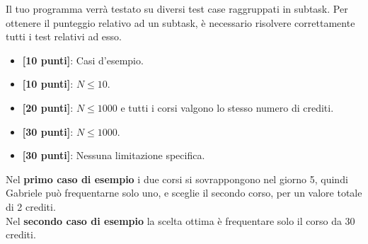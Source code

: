 \Scoring
Il tuo programma verrà testato su diversi test case raggruppati in subtask.
Per ottenere il punteggio relativo ad un subtask, è necessario risolvere
correttamente tutti i test relativi ad esso.

\begin{itemize}[nolistsep,itemsep=2mm]
  \item \textbf{ [10 punti]}: Casi d'esempio.
  \item \textbf{ [10 punti]}: $N \le 10$.
  \item \textbf{ [20 punti]}: $N \leq 1000$ e tutti i corsi valgono lo stesso numero di crediti.
  \item \textbf{ [30 punti]}: $N \leq 1000$.
  \item \textbf{ [30 punti]}: Nessuna limitazione specifica.
\end{itemize}

\Examples
\begin{example}
%
\end{example}
\begin{example}
%
\end{example}


\Explanation
Nel \textbf{primo caso di esempio} i due corsi si sovrappongono nel giorno 5, quindi Gabriele può frequentarne solo uno, e sceglie il secondo corso, per un valore totale di 2 crediti.\\[2mm]
Nel \textbf{secondo caso di esempio} la scelta ottima è frequentare solo il corso da 30 crediti.